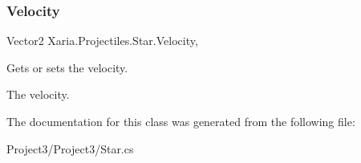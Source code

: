 \subsubsection{\texorpdfstring{Velocity}{Velocity}}
{\footnotesize\ttfamily Vector2 Xaria.\+Projectiles.\+Star.\+Velocity\hspace{0.3cm}{\ttfamily [get]}, {\ttfamily [set]}}



Gets or sets the velocity. 

The velocity. 

The documentation for this class was generated from the following file\+:\begin{DoxyCompactItemize}
\item 
Project3/\+Project3/Star.\+cs\end{DoxyCompactItemize}
